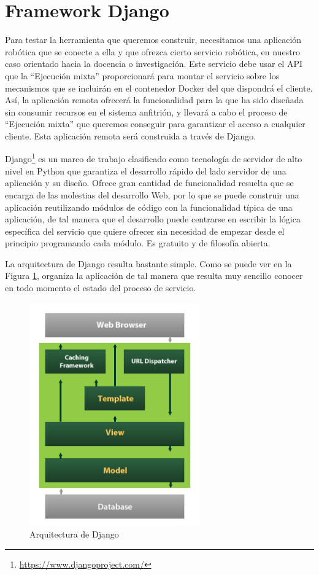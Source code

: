 \section{Framework Django}

Para testar la herramienta que queremos construir, necesitamos una aplicación robótica que se conecte a ella y que ofrezca cierto servicio robótica, en nuestro caso orientado hacia la docencia o investigación. Este servicio debe usar el API que la ``Ejecución mixta'' proporcionará para montar el servicio sobre los mecanismos que se incluirán en el contenedor Docker del que dispondrá el cliente. Así, la aplicación remota ofrecerá la funcionalidad para la que ha sido diseñada sin consumir recursos en el sistema anfitrión, y llevará a cabo el proceso de ``Ejecución mixta'' que queremos conseguir para garantizar el acceso a cualquier cliente. Esta aplicación remota será construida a través de Django.

Django\footnote{\url{https://www.djangoproject.com/}} es un marco de trabajo clasificado como tecnología de servidor de alto nivel en Python que garantiza el desarrollo rápido del lado servidor de una aplicación y su diseño. Ofrece gran cantidad de funcionalidad resuelta que se encarga de las molestias del desarrollo Web, por lo que se puede construir una aplicación reutilizando módulos de código con la funcionalidad típica de una aplicación, de tal manera que el desarrollo puede centrarse en escribir la lógica específica del servicio que quiere ofrecer sin necesidad de empezar desde el principio programando cada módulo. Es gratuito y de filosofía abierta.

La arquitectura de Django resulta bastante simple. Como se puede ver en la Figura \ref{django}, organiza la aplicación de tal manera que resulta muy sencillo conocer en todo momento el estado del proceso de servicio.

\begin{figure}[!hbtp]  \centering\noindent
    \includegraphics[width=0.65\textwidth]{figures/django-arch.png}
    \caption{Arquitectura de Django}
    \label{django}
\end{figure}

